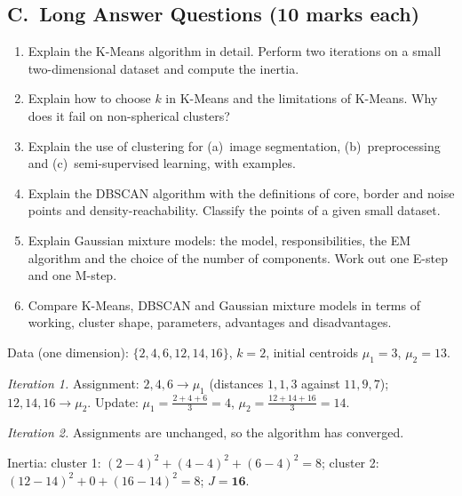 \subsection*{C.\ Long Answer Questions (10 marks each)}
\begin{enumerate}
  \item Explain the K-Means algorithm in detail. Perform two iterations on a small two-dimensional dataset and compute the inertia. 
  \item Explain how to choose $k$ in K-Means and the limitations of K-Means. Why does it fail on non-spherical clusters? 
  \item Explain the use of clustering for (a)~image segmentation, (b)~preprocessing and (c)~semi-supervised learning, with examples. 
  \item Explain the DBSCAN algorithm with the definitions of core, border and noise points and density-reachability. Classify the points of a given small dataset. 
  \item Explain Gaussian mixture models: the model, responsibilities, the EM algorithm and the choice of the number of components. Work out one E-step and one M-step. 
  \item Compare K-Means, DBSCAN and Gaussian mixture models in terms of working, cluster shape, parameters, advantages and disadvantages. 
\end{enumerate}

\begin{modelans}
Data (one dimension): $\{2,4,6,12,14,16\}$, $k=2$, initial centroids $\mu_1=3$, $\mu_2=13$.\par
\emph{Iteration 1.} Assignment: $2,4,6\to\mu_1$ (distances $1,1,3$ against $11,9,7$); $12,14,16\to\mu_2$. Update: $\mu_1=\frac{2+4+6}{3}=4$, $\mu_2=\frac{12+14+16}3=14$.\par
\emph{Iteration 2.} Assignments are unchanged, so the algorithm has converged.\par
Inertia: cluster 1: $(2-4)^2+(4-4)^2+(6-4)^2=8$; cluster 2: $(12-14)^2+0+(16-14)^2=8$; $J=\mathbf{16}$.
\end{modelans}

